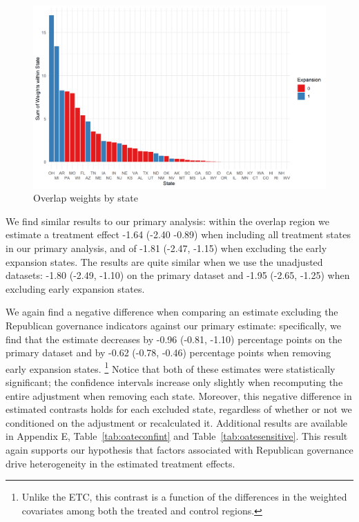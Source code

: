 \documentclass[12pt]{article}
\begin{document}
\begin{figure}[]
\begin{center}
    \includegraphics[scale=0.6]{01_Plots/oate-region-c1-a.png}
    \caption{Overlap weights by state}
    \label{oatearea}
\end{center}
\end{figure}

We find similar results to our primary analysis: within the overlap region we estimate a treatment effect -1.64 (-2.40 -0.89) when including all treatment states in our primary analysis, and of -1.81 (-2.47, -1.15) when excluding the early expansion states. The results are quite similar when we use the unadjusted datasets: -1.80 (-2.49, -1.10) on the primary dataset and -1.95 (-2.65, -1.25) when excluding early expansion states. 

We again find a negative difference when comparing an estimate excluding the Republican governance indicators against our primary estimate: specifically, we find that the estimate decreases by -0.96 (-0.81, -1.10) percentage points on the primary dataset and by -0.62 (-0.78, -0.46) percentage points when removing early expansion states. \footnote{Unlike the ETC, this contrast is a function of the differences in the weighted covariates among both the treated and control regions.} Notice that both of these estimates were statistically significant; the confidence intervals increase only slightly when recomputing the entire adjustment when removing each state. Moreover, this negative difference in estimated contrasts holds for each excluded state, regardless of whether or not we conditioned on the adjustment or recalculated it. Additional results are available in Appendix E, Table~\ref{tab:oateconfint} and Table~\ref{tab:oatesensitive}. This result again supports our hypothesis that factors associated with Republican governance drive heterogeneity in the estimated treatment effects.
\end{document}
